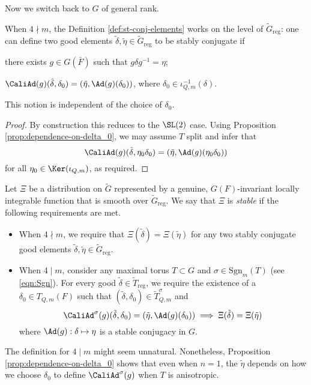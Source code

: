 \documentclass[a4paper,10pt]{article}
\begin{document}
Now we switch back to $G$ of general rank.
\begin{corollary}\label{prop:st-conj-elements-canonical}
	When $4 \nmid m$, the Definition \ref{def:st-conj-elements} works on the level of $\tilde{G}_\mathrm{reg}$: one can define two good elements $\tilde{\delta}, \tilde{\eta} \in \tilde{G}_\mathrm{reg}$ to be stably conjugate if
	\begin{compactitem}
		\item there exists $g \in G(\bar{F})$ such that $g \delta g^{-1} = \eta$;
		\item $\CaliAd(g)(\tilde{\delta}, \delta_0) = (\tilde{\eta}, \Ad(g)(\delta_0))$, where $\delta_0 \in \iota_{Q,m}^{-1}(\delta)$.
	\end{compactitem}
	This notion is independent of the choice of $\delta_0$.
\end{corollary}
\begin{proof}
	By construction this reduces to the $\SL(2)$ case. Using Proposition \ref{prop:dependence-on-delta_0}, we may assume $T$ split and infer that
	\[ \CaliAd(g)(\tilde{\delta}, \eta_0 \delta_0) = \left( \tilde{\eta}, \Ad(g)(\eta_0 \delta_0) \right) \]
	for all $\eta_0 \in \Ker(\iota_{Q,m})$, as required.
\end{proof}

\begin{definition}\label{def:stability} 
	Let $\Xi$ be a distribution on $\tilde{G}$ represented by a genuine, $G(F)$-invariant locally integrable function that is smooth over $\tilde{G}_{\mathrm{reg}}$. We say that $\Xi$ is \emph{stable} if the following requirements are met.
	\begin{itemize}
		\item When $4 \nmid m$, we require that $\Xi(\tilde{\delta}) = \Xi(\tilde{\eta})$ for any two stably conjugate good elements $\tilde{\delta}, \tilde{\eta} \in \tilde{G}_\mathrm{reg}$.
		\item When $4 \mid m$, consider any maximal torus $T \subset G$ and $\sigma \in \mathrm{Sgn}_m(T)$ (see \eqref{eqn:Sgn}). For every good $\tilde{\delta} \in \tilde{T}_{\mathrm{reg}}$, we require the existence of a $\delta_0 \in T_{Q,m}(F)$ such that $(\tilde{\delta}, \delta_0) \in \tilde{T}^\sigma_{Q,m}$ and
		\[ \CaliAd^\sigma(g)(\tilde{\delta}, \delta_0) = \left( \tilde{\eta}, \Ad(g)(\delta_0)\right) \implies \Xi(\tilde{\delta}) = \Xi(\tilde{\eta}) \]
		where $\Ad(g): \delta \mapsto \eta$ is a stable conjugacy in $G$.
	\end{itemize}
\end{definition}
The definition for $4 \mid m$ might seem unnatural. Nonetheless, Proposition \ref{prop:dependence-on-delta_0} shows that even when $n=1$, the $\tilde{\eta}$ depends on how we choose $\delta_0$ to define $\CaliAd^\sigma(g)$ when $T$ is anisotropic.
\end{document}
